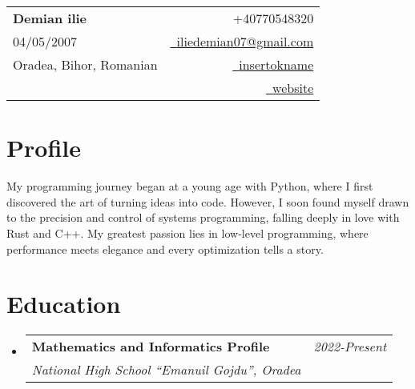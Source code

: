 \documentclass[a4paper,11pt]{article}
\makeatletter
\newcommand{\resumeSubheading}[4]{
\vspace{0.5mm}\item
    \begin{tabular*}{0.98\textwidth}[t]{l@{\extracolsep{\fill}}r}
        \textbf{#1} & \textit{\footnotesize{#4}} \\
        \textit{\footnotesize{#3}} &  \footnotesize{#2}\\
    \end{tabular*}
    \vspace{-2.4mm}
}
\newcommand{\resumeSubHeadingListStart}{\begin{itemize}[leftmargin=*,labelsep=0mm]}
\newcommand{\resumeSubHeadingListEnd}{\end{itemize}\vspace{2mm}}
\newcommand{\name}{Demian ilie} %
\newcommand{\phone}{+40770548320} %
\newcommand{\emaila}{iliedemian07@gmail.com} %
\makeatother
\begin{document}
\selectfont

%     
\parbox{\linewidth}{ %
    \begin{tabularx}{\linewidth}{L r}                                                                                                                          \\
        \textbf{\Large \name}     & {\raisebox{0.0\height}{\footnotesize \faPhone}\ \phone}                                                        \\
        {04/05/2007}              & \href{mailto:\emaila}{\raisebox{0.0\height}{\footnotesize \faEnvelope}\ {\emaila}}                             \\
        {Oradea, Bihor, Romanian} & \href{https://github.com/insertokname}{\raisebox{0.0\height}{\footnotesize \faGithub}\ {insertokname}}         \\
                                  & \href{https://insertokname.github.io/personal-page/}{\raisebox{0.0\height}{\footnotesize \faGlobe}\ {website}} \\
    \end{tabularx}
}

\vspace{-0.5cm}
\section{\textbf{Profile}}
\begin{justify}
    My programming journey began at a young age with Python, where I first discovered the art of turning ideas into code.
    However, I soon found myself drawn to the precision and control of systems programming, falling deeply in love with Rust and C++.
    My greatest passion lies in low-level programming, where performance meets elegance and every optimization tells a story.
\end{justify}


\section{\textbf{Education}}
\resumeSubHeadingListStart
\resumeSubheading
{Mathematics and Informatics Profile}{}
{National High School ``Emanuil Gojdu'', Oradea}{2022-Present}
\resumeSubHeadingListEnd
\vspace{-5.5mm}
\end{document}
